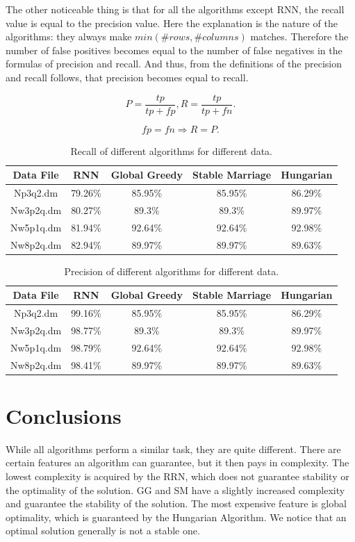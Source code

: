 \documentclass[a4paper,11pt]{article}
\begin{document}
The other noticeable thing is that for all the algorithms except RNN, the recall value is equal to the precision value. Here the explanation is the nature of the algorithms: they always make $min(\#rows, \#columns)$ matches. Therefore the number of false positives becomes equal to the number of false negatives in the formulas of precision and recall. And thus, from the definitions of the precision and recall follows, that precision becomes equal to recall.


\[P = \frac{tp}{tp+fp}, R = \frac{tp}{tp+fn}.\]

\[fp=fn \Rightarrow R=P.\]

\begin{table}[tbh]
\centering
\begin{tabular}{|c|c|c|c|c|}
\hline 
Data File & RNN & Global Greedy & Stable Marriage & Hungarian \tabularnewline
\hline 
\hline 
 Np3q2.dm & 79.26\% & 85.95\% & 85.95\% & 86.29\%\tabularnewline
\hline
 Nw3p2q.dm & 80.27\% & 89.3\% & 89.3\% & 89.97\%\tabularnewline
\hline 
 Nw5p1q.dm & 81.94\% & 92.64\% & 92.64\% & 92.98\%\tabularnewline
\hline 
 Nw8p2q.dm & 82.94\% & 89.97\% & 89.97\% & 89.63\%\tabularnewline
\hline
\end{tabular}
\caption{Recall of different algorithms for different data.}
\label{recall}
\end{table}

\begin{table}[tbh]
\centering
\begin{tabular}{|c|c|c|c|c|}
\hline 
Data File & RNN & Global Greedy & Stable Marriage & Hungarian \tabularnewline
\hline 
\hline 
 Np3q2.dm & 99.16\% & 85.95\% & 85.95\% & 86.29\%\tabularnewline
\hline
 Nw3p2q.dm & 98.77\% & 89.3\% & 89.3\% & 89.97\%\tabularnewline
\hline 
 Nw5p1q.dm & 98.79\% & 92.64\% & 92.64\% & 92.98\%\tabularnewline
\hline 
 Nw8p2q.dm & 98.41\% & 89.97\% & 89.97\% & 89.63\%\tabularnewline
\hline
\end{tabular}
\caption{Precision of different algorithms for different data.}
\label{precision}
\end{table}

\section{Conclusions}



While all algorithms perform a similar task, they are quite different. There are certain features an algorithm can guarantee, but it then pays in complexity. The lowest complexity is acquired by the RRN, which does not guarantee stability or the optimality of the solution. GG and SM have a slightly increased complexity and guarantee the stability of the solution. The most expensive feature is global optimality, which is guaranteed by the Hungarian Algorithm. We notice that an optimal solution generally is not a stable one.
\end{document}
